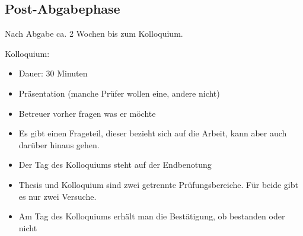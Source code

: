 \subsection{Post-Abgabephase}
Nach Abgabe ca. 2 Wochen bis zum Kolloquium.

Kolloquium:
\begin{itemize}
\item Dauer: 30 Minuten
\item Präsentation (manche Prüfer wollen eine, andere nicht)
\item Betreuer vorher fragen was er möchte
\item Es gibt einen Frageteil, dieser bezieht sich auf die Arbeit, kann aber auch darüber hinaus gehen.
\item Der Tag des Kolloquiums steht auf der Endbenotung
\item Thesis und Kolloquium sind zwei getrennte Prüfungsbereiche. Für beide gibt es nur zwei Versuche.
\item Am Tag des Kolloquiums erhält man die Bestätigung, ob bestanden oder nicht
\end{itemize}
